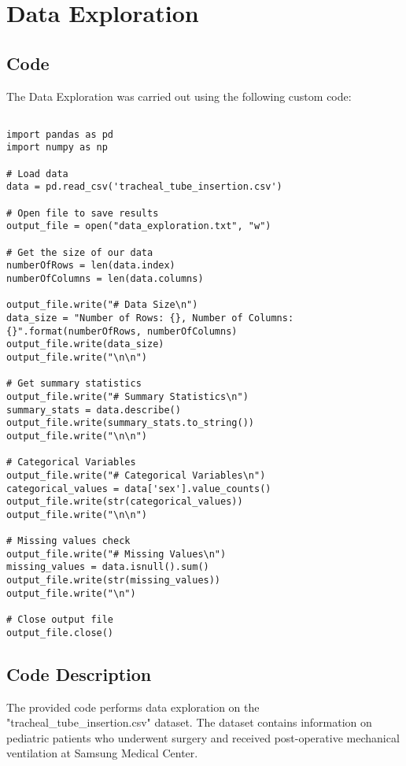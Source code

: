\documentclass[11pt]{article}
\begin{document}
\section{Data Exploration}
\subsection{{Code}}
The Data Exploration was carried out using the following custom code:

\begin{verbatim}

import pandas as pd
import numpy as np

# Load data
data = pd.read_csv('tracheal_tube_insertion.csv')

# Open file to save results
output_file = open("data_exploration.txt", "w")

# Get the size of our data
numberOfRows = len(data.index)
numberOfColumns = len(data.columns)

output_file.write("# Data Size\n")
data_size = "Number of Rows: {}, Number of Columns: {}".format(numberOfRows, numberOfColumns)
output_file.write(data_size)
output_file.write("\n\n")

# Get summary statistics
output_file.write("# Summary Statistics\n")
summary_stats = data.describe()
output_file.write(summary_stats.to_string())
output_file.write("\n\n")

# Categorical Variables
output_file.write("# Categorical Variables\n")
categorical_values = data['sex'].value_counts()
output_file.write(str(categorical_values))
output_file.write("\n\n")

# Missing values check
output_file.write("# Missing Values\n")
missing_values = data.isnull().sum()
output_file.write(str(missing_values))
output_file.write("\n")

# Close output file
output_file.close()

\end{verbatim}

\subsection{Code Description}

The provided code performs data exploration on the "tracheal\_tube\_insertion.csv" dataset. The dataset contains information on pediatric patients who underwent surgery and received post-operative mechanical ventilation at Samsung Medical Center.
\end{document}
